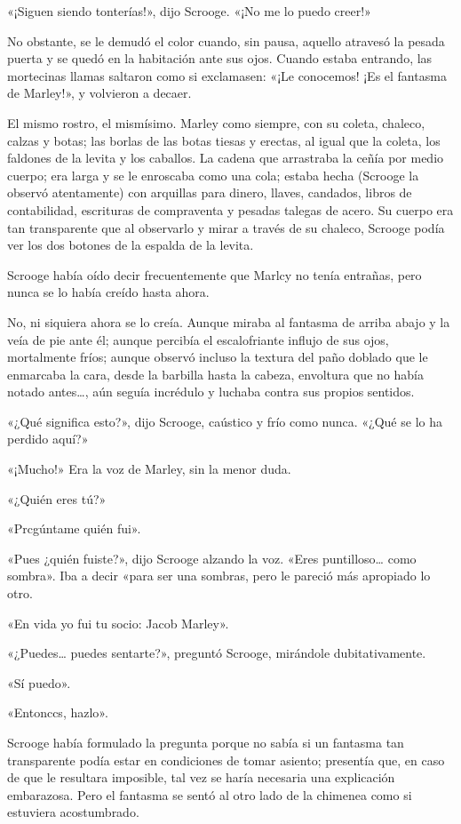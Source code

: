 \documentclass{novela}
\begin{document}
 «¡Siguen siendo tonterías!», dijo Scrooge. «¡No me lo puedo creer!»

 No obstante, se le demudó el color cuando, sin pausa, aquello atravesó la pesada puerta y se quedó en la habitación ante sus ojos. Cuando estaba entrando, las mortecinas llamas saltaron como si exclamasen: «¡Le conocemos! ¡Es el fantasma de Marley!», y volvieron a decaer.

 El mismo rostro, el mismísimo. Marley como siempre, con su coleta, chaleco, calzas y botas; las borlas de las botas tiesas y erectas, al igual que la coleta, los faldones de la levita y los caballos. La cadena que arrastraba la ceñía por medio cuerpo; era larga y se le enroscaba como una cola; estaba hecha (Scrooge la observó atentamente) con arquillas para dinero, llaves, candados, libros de contabilidad, escrituras de compraventa y pesadas talegas de acero. Su cuerpo era tan transparente que al observarlo y mirar a través de su chaleco, Scrooge podía ver los dos botones de la espalda de la levita.

 Scrooge había oído decir frecuentemente que Marlcy no tenía entrañas, pero nunca se lo había creído hasta ahora.

 No, ni siquiera ahora se lo creía. Aunque miraba al fantasma de arriba abajo y la veía de pie ante él; aunque percibía el escalofriante influjo de sus ojos, mortalmente fríos; aunque observó incluso la textura del paño doblado que le enmarcaba la cara, desde la barbilla hasta la cabeza, envoltura que no había notado antes{\ldots}, aún seguía incrédulo y luchaba contra sus propios sentidos.

 «¿Qué significa esto?», dijo Scrooge, caústico y frío como nunca. «¿Qué se lo ha perdido aquí?»

 «¡Mucho!» Era la voz de Marley, sin la menor duda.

 «¿Quién eres tú?»

 «Prcgúntame quién fui».

 «Pues ¿quién fuiste?», dijo Scrooge alzando la voz. «Eres puntilloso{\ldots} como sombra». Iba a decir «para ser una sombras, pero le pareció más apropiado lo otro.

 «En vida yo fui tu socio: Jacob Marley».

 «¿Puedes{\ldots} puedes sentarte?», preguntó Scrooge, mirándole dubitativamente.

 «Sí puedo».

 «Entonccs, hazlo».

 Scrooge había formulado la pregunta porque no sabía si un fantasma tan transparente podía estar en condiciones de tomar asiento; presentía que, en caso de que le resultara imposible, tal vez se haría necesaria una explicación embarazosa. Pero el fantasma se sentó al otro lado de la chimenea como si estuviera acostumbrado.
\end{document}
